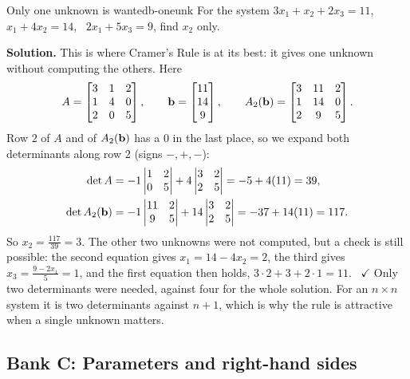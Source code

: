 \documentclass[11pt]{article}
\begin{document}
\begin{exmp}{Only one unknown is wanted}{b-oneunk}
For the system $3x_1+x_2+2x_3=11$, \ $x_1+4x_2=14$, \ $2x_1+5x_3=9$, find $x_2$ only.

\textbf{Solution.} This is where Cramer's Rule is at its best: it gives one unknown without computing the others. Here
\[
A=\begin{bmatrix}3&1&2\\1&4&0\\2&0&5\end{bmatrix},\qquad\mathbf{b}=\begin{bmatrix}11\\14\\9\end{bmatrix},\qquad A_2(\mathbf{b})=\begin{bmatrix}3&11&2\\1&14&0\\2&9&5\end{bmatrix}.
\]
Row $2$ of $A$ and of $A_2(\mathbf{b})$ has a $0$ in the last place, so we expand both determinants along row $2$ (signs $-,+,-$):
\begin{align*}
\det A&=-1\begin{vmatrix}1&2\\0&5\end{vmatrix}+4\begin{vmatrix}3&2\\2&5\end{vmatrix}=-5+4(11)=39,\\
\det A_2(\mathbf{b})&=-1\begin{vmatrix}11&2\\9&5\end{vmatrix}+14\begin{vmatrix}3&2\\2&5\end{vmatrix}=-37+14(11)=117.
\end{align*}
So $x_2=\frac{117}{39}=3$. The other two unknowns were not computed, but a check is still possible: the second equation gives $x_1=14-4x_2=2$, the third gives $x_3=\frac{9-2x_1}5=1$, and the first equation then holds, $3\cdot2+3+2\cdot1=11$. \ $\checkmark$ Only two determinants were needed, against four for the whole solution. For an $n\times n$ system it is two determinants against $n+1$, which is why the rule is attractive when a single unknown matters.
\end{exmp}

\subsection*{Bank C: Parameters and right-hand sides}
\end{document}
